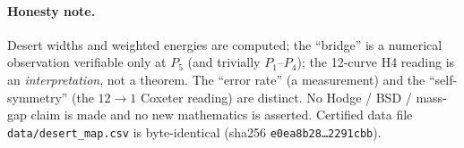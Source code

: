 \documentclass[11pt]{article}
\newcommand{\dt}{\ldots}
\begin{document}
\paragraph{Honesty note.}
Desert widths and weighted energies are computed; the ``bridge'' is a numerical
observation verifiable only at $P_5$ (and trivially $P_1$--$P_4$); the 12-curve
H4 reading is an \emph{interpretation}, not a theorem. The ``error rate'' (a
measurement) and the ``self-symmetry'' (the $12\to1$ Coxeter reading) are
distinct. No Hodge / BSD / mass-gap claim is made and no new mathematics is
asserted. Certified data file \texttt{data/desert\_map.csv} is byte-identical
(sha256 \texttt{e0ea8b28\dt2291cbb}).
\end{document}
